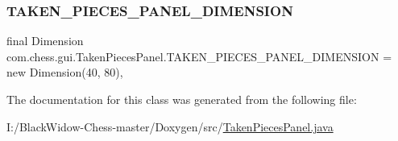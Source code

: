 \subsubsection{\texorpdfstring{TAKEN\_PIECES\_PANEL\_DIMENSION}{TAKEN\_PIECES\_PANEL\_DIMENSION}}
{\footnotesize\ttfamily final Dimension com.\+chess.\+gui.\+Taken\+Pieces\+Panel.\+T\+A\+K\+E\+N\+\_\+\+P\+I\+E\+C\+E\+S\+\_\+\+P\+A\+N\+E\+L\+\_\+\+D\+I\+M\+E\+N\+S\+I\+ON = new Dimension(40, 80)\hspace{0.3cm}{\ttfamily [static]}, {\ttfamily [private]}}



The documentation for this class was generated from the following file\+:\begin{DoxyCompactItemize}
\item 
I\+:/\+Black\+Widow-\/\+Chess-\/master/\+Doxygen/src/\mbox{\hyperlink{_taken_pieces_panel_8java}{Taken\+Pieces\+Panel.\+java}}\end{DoxyCompactItemize}
